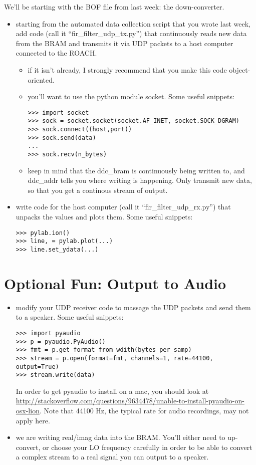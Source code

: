 \documentclass[11pt]{article}
\begin{document}
We'll be starting with the BOF file from last week: the down-converter.

\begin{itemize}
\item starting from the automated data collection script that you wrote last week, add code (call it
``fir\_filter\_udp\_tx.py'') that continuously
reads new data from the BRAM and transmits it via UDP packets to a host computer connected to the ROACH.
\begin{itemize}
\item if it isn't already, I strongly recommend that you make this code object-oriented.
\item you'll want to use the python module socket.  Some useful snippets:
\begin{verbatim}
>>> import socket
>>> sock = socket.socket(socket.AF_INET, socket.SOCK_DGRAM)
>>> sock.connect((host,port))
>>> sock.send(data)
...
>>> sock.recv(n_bytes)
\end{verbatim}
\item keep in mind that the ddc\_bram is continuously being written to, and ddc\_addr tells you where writing
is happening.  Only transmit new data, so that you get a continous stream of output.

\end{itemize}
\item write code for the host computer (call it ``fir\_filter\_udp\_rx.py'') that unpacks the values and 
plots them.  Some useful snippets:
\begin{verbatim}
>>> pylab.ion()
>>> line, = pylab.plot(...)
>>> line.set_ydata(...)
\end{verbatim}
\end{itemize}

\section{Optional Fun: Output to Audio}
\begin{itemize}
\item modify your UDP receiver code to massage the UDP packets and send them to a speaker.  Some useful snippets:
\begin{verbatim}
>>> import pyaudio
>>> p = pyaudio.PyAudio()
>>> fmt = p.get_format_from_wdith(bytes_per_samp)
>>> stream = p.open(format=fmt, channels=1, rate=44100, output=True)
>>> stream.write(data)
\end{verbatim}
In order to get pyaudio to install on a mac, you should look at \url{http://stackoverflow.com/questions/9634478/unable-to-install-pyaudio-on-osx-lion}.
Note that 44100 Hz, the typical rate for audio recordings, may not apply here.
\item we are writing real/imag data into the BRAM.  You'll either need to up-convert, or choose your LO
frequency carefully in order to be able to convert a complex stream to a real signal you can output to a speaker.
\end{itemize}
\end{document}
